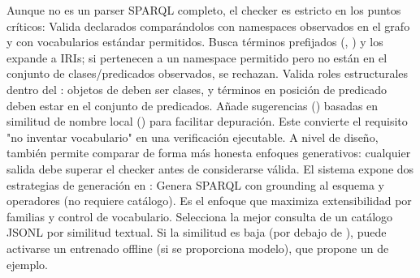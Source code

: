 {}Aunque no es un parser SPARQL completo, el checker es estricto en los puntos críticos:\markdownRendererInterblockSeparator
{}\markdownRendererUlBeginTight
\markdownRendererUlItem Valida  declarados comparándolos con namespaces observados en el grafo y con vocabularios estándar permitidos.\markdownRendererUlItemEnd 
\markdownRendererUlItem Busca términos prefijados (, ) y los expande a IRIs; si pertenecen a un namespace permitido pero no están en el conjunto de clases/predicados observados, se rechazan.\markdownRendererUlItemEnd 
\markdownRendererUlItem Valida roles estructurales dentro del : objetos de  deben ser clases, y términos en posición de predicado deben estar en el conjunto de predicados.\markdownRendererUlItemEnd 
\markdownRendererUlItem Añade sugerencias () basadas en similitud de nombre local () para facilitar depuración.\markdownRendererUlItemEnd 
\markdownRendererUlEndTight \markdownRendererInterblockSeparator
{}Este  convierte el requisito "no inventar vocabulario" en una verificación ejecutable. A nivel de diseño, también permite comparar de forma más honesta enfoques generativos: cualquier salida debe superar el checker antes de considerarse válida.\markdownRendererInterblockSeparator
{}\markdownRendererInterblockSeparator
{}El sistema expone dos estrategias de generación en :\markdownRendererInterblockSeparator
{}\markdownRendererUlBeginTight
\markdownRendererUlItem {} Genera SPARQL  con grounding al esquema y operadores (no requiere catálogo). Es el enfoque que maximiza extensibilidad por familias y control de vocabulario.\markdownRendererUlItemEnd 
\markdownRendererUlItem {} Selecciona la mejor consulta de un catálogo JSONL por similitud textual. Si la similitud es baja (por debajo de ), puede activarse un  entrenado offline (si se proporciona modelo), que propone un  de ejemplo.\markdownRendererUlItemEnd 
